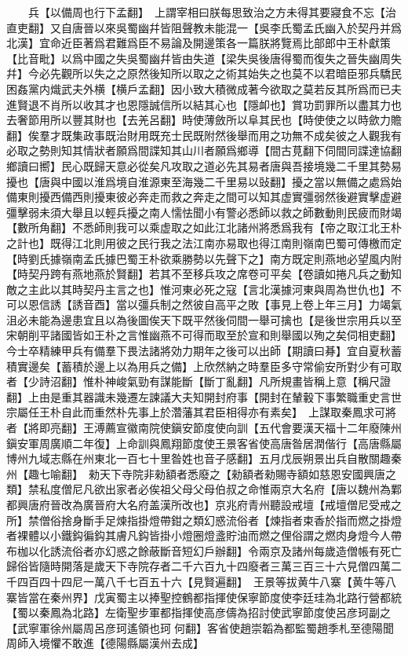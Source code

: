 　　兵【以備周也行下孟翻】　上謂宰相曰朕每思致治之方未得其要寢食不忘【治直吏翻】又自唐晉以來吳蜀幽幷皆阻聲教未能混一【吳李氏蜀孟氏幽入於契丹并爲北漢】宜命近臣著爲君難爲臣不易論及開邊策各一篇朕將覽焉比部郎中王朴獻策【比音毗】以爲中國之失吳蜀幽幷皆由失道【梁失吳後唐得蜀而復失之晉失幽周失幷】今必先觀所以失之之原然後知所以取之之術其始失之也莫不以君暗臣邪兵驕民困姦黨内熾武夫外横【横戶孟翻】因小致大積微成著今欲取之莫若反其所爲而已夫進賢退不肖所以收其才也恩隱誠信所以結其心也【隱卹也】賞功罰罪所以盡其力也去奢節用所以豐其財也【去羌呂翻】時使薄斂所以阜其民也【時使使之以時歛力贍翻】俟羣才既集政事既治財用既充士民既附然後舉而用之功無不成矣彼之人觀我有必取之勢則知其情狀者願爲間諜知其山川者願爲鄉導【間古莧翻下伺間同諜達協翻鄉讀曰嚮】民心既歸天意必從矣凡攻取之道必先其易者唐與吾接境幾二千里其勢易擾也【唐與中國以淮爲境自淮源東至海幾二千里易以䜴翻】擾之當以無備之處爲始備東則擾西備西則擾東彼必奔走而救之奔走之間可以知其虚實彊弱然後避實擊虚避彊擊弱未須大舉且以輕兵擾之南人懦怯聞小有警必悉師以救之師數動則民疲而財竭【數所角翻】不悉師則我可以乘虚取之如此江北諸州將悉爲我有【帝之取江北王朴之計也】既得江北則用彼之民行我之法江南亦易取也得江南則嶺南巴蜀可傳檄而定【時劉氏據嶺南孟氏據巴蜀王朴欲乘勝勢以先聲下之】南方既定則燕地必望風内附【時契丹跨有燕地燕於賢翻】若其不至移兵攻之席卷可平矣【卷讀如捲凡兵之動知敵之主此以其時契丹主言之也】惟河東必死之寇【言北漢據河東與周為世仇也】不可以恩信誘【誘音酉】當以彊兵制之然彼自高平之敗【事見上卷上年三月】力竭氣沮必未能為邊患宜且以為後圖俟天下既平然後伺間一舉可擒也【是後世宗用兵以至宋朝削平諸國皆如王朴之言惟幽燕不可得而取至於宣和則舉國以殉之矣伺相吏翻】今士卒精練甲兵有備羣下畏法諸將効力期年之後可以出師【期讀曰朞】宜自夏秋蓄積實邊矣【蓄積於邊上以為用兵之備】上欣然納之時羣臣多守常偷安所對少有可取者【少詩沼翻】惟朴神峻氣勁有謀能斷【斷丁亂翻】凡所規畫皆稱上意【稱尺證翻】上由是重其器識未幾遷左諫議大夫知開封府事【開封在輦轂下事繁職重史言世宗屬任王朴自此而重然朴先事上於濳藩其君臣相得亦有素矣】　上謀取秦鳳求可將者【將即亮翻】王溥薦宣徽南院使鎭安節度使向訓【五代會要漢天福十二年廢陳州鎭安軍周廣順二年復】上命訓與鳳翔節度使王景客省使高唐昝居潤偕行【高唐縣屬博州九域志縣在州東北一百七十里昝姓也音子感翻】五月戊辰朔景出兵自散關趣秦州【趣七喻翻】　勑天下寺院非勑額者悉廢之【勑額者勑賜寺額如慈恩安國興唐之類】禁私度僧尼凡欲出家者必俟祖父母父母伯叔之命惟兩京大名府【唐以魏州為鄴都興唐府晉改為廣晉府大名府盖漢所改也】京兆府青州聽設戒壇【戒壇僧尼受戒之所】禁僧俗捨身斷手足煉指掛燈帶鉗之類幻惑流俗者【煉指者束香於指而燃之掛燈者裸體以小鐵鈎徧鈎其膚凡鈎皆掛小燈圈燈盞貯油而燃之俚俗謂之燃肉身燈今人帶布枷以化誘流俗者亦幻惑之餘蔽斷音短幻戶辦翻】令兩京及諸州每歲造僧帳有死亡歸俗皆隨時開落是歲天下寺院存者二千六百九十四廢者三萬三百三十六見僧四萬二千四百四十四尼一萬八千七百五十六【見賢遍翻】　王景等拔黄牛八寨【黄牛等八寨皆當在秦州界】戊寅蜀主以捧聖控鶴都指揮使保寧節度使李廷珪為北路行營都統【蜀以秦鳳為北路】左衛聖步軍都指揮使高彦儔為招討使武寧節度使呂彦珂副之【武寧軍徐州屬周呂彦珂遙領也珂何翻】客省使趙崇韜為都監蜀趙季札至德陽聞周師入境懼不敢進【德陽縣屬漢州去成】

